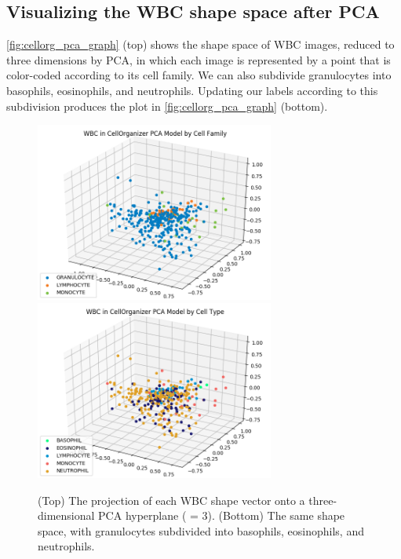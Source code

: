 \begin{note}[%
It can be proven that for any dataset, when $d_1$ is smaller than $d_2$, the hyperplane provided by PCA of dimension $d_1$ is \textit{always} a subset of the hyperplane of dimension $d_2$. For example, the first principal component is always found within the plane ($d = 2$) provided by PCA, which was indicated in \autoref{fig:three_dimensional_pca} (left).
]\end{note}

\FloatBarrier
{}
\subsection{Visualizing the WBC shape space after PCA}

\autoref{fig:cellorg_pca_graph} (top) shows the shape space of WBC images, reduced to three dimensions by PCA, in which each image is represented by a point that is color-coded according to its cell family. We can also subdivide granulocytes into basophils, eosinophils, and neutrophils. Updating our labels according to this subdivision produces the plot in \autoref{fig:cellorg_pca_graph} (bottom).

\begin{figure}[p]
\centering
\mySfFamily
\includegraphics[width = 0.7\textwidth]{../images/cellorg_pca_graph.png}\\[4ex]
\includegraphics[width = 0.7\textwidth]{../images/cellorg_pca_graph_cell.png}
\caption{(Top) The projection of each WBC shape vector onto a three-dimensional PCA hyperplane ( = 3). (Bottom) The same shape space, with granulocytes subdivided into basophils, eosinophils, and neutrophils.}
\label{fig:cellorg_pca_graph}
\end{figure}



